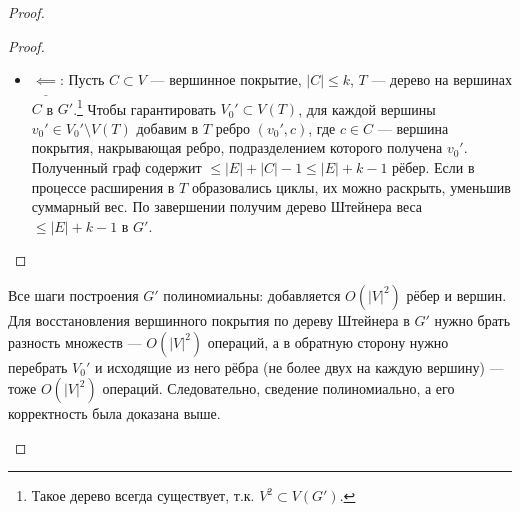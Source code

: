 \documentclass[11pt,a4paper]{report}
\def\le{\leqslant}
\theoremstyle{definition}
\theoremstyle{definition}
\theoremstyle{definition}
\begin{document}
\begin{proof}
\begin{enumerate}
\begin{proof}
\begin{itemize}
					\item $ \underline{\impliedby} $:  Пусть $C \subset V$ — вершинное покрытие, $|C| \le k$, $T$ — дерево на вершинах $C$ в $G'$.\footnote{Такое дерево всегда существует, т.к. $V^2 \subset V(G')$.} Чтобы гарантировать $V_0' \subset V(T)$, для каждой вершины $v_0' \in V_0' \setminus V(T)$ добавим в $T$ ребро $(v_0', c)$, где $c \in C$ — вершина покрытия, накрывающая ребро, подразделением которого получена $v_0'$. Полученный граф содержит $\le |E| + |C| - 1 \le |E| + k - 1$ рёбер. Если в процессе расширения в $T$ образовались циклы, их можно раскрыть, уменьшив суммарный вес. По завершении получим дерево Штейнера веса $\le |E| + k - 1$ в $G'$.
				\end{itemize} 
			\end{proof}
			Все шаги построения $G'$ полиномиальны: добавляется $O(|V|^2)$ рёбер и вершин. Для восстановления вершинного покрытия по дереву Штейнера в $G'$ нужно брать разность множеств — $O(|V|^2)$ операций, а в обратную сторону нужно перебрать $V_0'$ и исходящие из него рёбра (не более двух на каждую вершину) — тоже $O(|V|^2)$ операций. Следовательно, сведение полиномиально, а его корректность была доказана выше.
		\end{enumerate}
	\end{proof}
\end{document}
